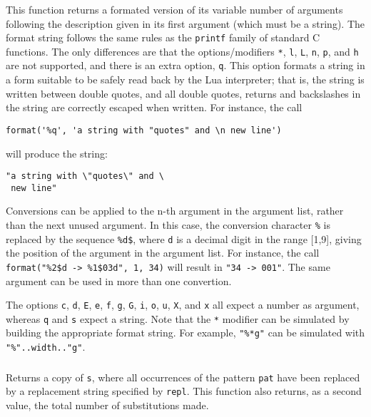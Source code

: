 \subsubsection*{\ff {}}
\label{format}
This function returns a formated version of its variable number of arguments
following the description given in its first argument (which must be a string).
The format string follows the same rules as the \verb|printf| family of
standard C functions.
The only differences are that the options/modifiers
\verb|*|, \verb|l|, \verb|L|, \verb|n|, \verb|p|,
and \verb|h| are not supported,
and there is an extra option, \verb|q|.
This option formats a string in a form suitable to be safely read
back by the Lua interpreter;
that is,
the string is written between double quotes,
and all double quotes, returns and backslashes in the string
are correctly escaped when written.
For instance, the call
\begin{verbatim}
format('%q', 'a string with "quotes" and \n new line')
\end{verbatim}
will produce the string:
\begin{verbatim}
"a string with \"quotes\" and \
 new line"
\end{verbatim}

Conversions can be applied to the n-th argument in the argument list,
rather than the next unused argument.
In this case, the conversion character \verb|%| is replaced
by the sequence \verb|%d$|, where \verb|d| is a
decimal digit in the range [1,9],
giving the position of the argument in the argument list.
For instance, the call \verb|format("%2$d -> %1$03d", 1, 34)| will
result in \verb|"34 -> 001"|.
The same argument can be used in more than one convertion.

The options \verb|c|, \verb|d|, \verb|E|, \verb|e|, \verb|f|,
\verb|g|, \verb|G|, \verb|i|, \verb|o|, \verb|u|, \verb|X|, and \verb|x| all
expect a number as argument,
whereas \verb|q| and \verb|s| expect a string.
Note that the \verb|*| modifier can be simulated by building
the appropriate format string.
For example, \verb|"%*g"| can be simulated with
\verb|"%"..width.."g"|.

\subsubsection*{\ff {}}
Returns a copy of \verb|s|,
where all occurrences of the pattern \verb|pat| have been
replaced by a replacement string specified by \verb|repl|.
This function also returns, as a second value,
the total number of substitutions made.

